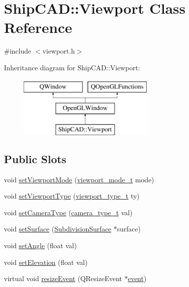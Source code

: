 \hypertarget{classShipCAD_1_1Viewport}{\section{Ship\-C\-A\-D\-:\-:Viewport Class Reference}
\label{classShipCAD_1_1Viewport}
}


{\ttfamily \#include $<$viewport.\-h$>$}

Inheritance diagram for Ship\-C\-A\-D\-:\-:Viewport\-:\begin{figure}[H]
\begin{center}
\leavevmode
\includegraphics[height=3.000000cm]{classShipCAD_1_1Viewport}
\end{center}
\end{figure}
\subsection*{Public Slots}
\begin{DoxyCompactItemize}
\item 
void \hyperlink{classShipCAD_1_1Viewport_a578ac5ee96e36638739517fa21bf70c0}{set\-Viewport\-Mode} (\hyperlink{namespaceShipCAD_a67437198ee14f74e6c5277d761894863}{viewport\-\_\-mode\-\_\-t} mode)
\item 
void \hyperlink{classShipCAD_1_1Viewport_a554a3455c39ee5652b13c9b24c3c962e}{set\-Viewport\-Type} (\hyperlink{namespaceShipCAD_aeeeb05810f2e31ef89fd4ac6b6ba9c0a}{viewport\-\_\-type\-\_\-t} ty)
\item 
void \hyperlink{classShipCAD_1_1Viewport_a5f90a885e0204b32ff9795c4b79f824b}{set\-Camera\-Type} (\hyperlink{namespaceShipCAD_a58f51ebd2e66de5e41c2ffd6f434241e}{camera\-\_\-type\-\_\-t} val)
\item 
void \hyperlink{classShipCAD_1_1Viewport_a4bb2b85a12d7dd14e44b5d5c199cbda7}{set\-Surface} (\hyperlink{classShipCAD_1_1SubdivisionSurface}{Subdivision\-Surface} $\ast$surface)
\item 
void \hyperlink{classShipCAD_1_1Viewport_a00ba2139fa06701b65de70d5c657f5d6}{set\-Angle} (float val)
\item 
void \hyperlink{classShipCAD_1_1Viewport_a4bda4b742dc477ed5dc2ab6ac7fe92bc}{set\-Elevation} (float val)
\item 
virtual void \hyperlink{classShipCAD_1_1Viewport_a4eeeb100fd88487215bb7794bdf5e0cb}{resize\-Event} (Q\-Resize\-Event $\ast$\hyperlink{classOpenGLWindow_a1e3045cffb900de55b7384f5091c9d94}{event})
\end{DoxyCompactItemize}

